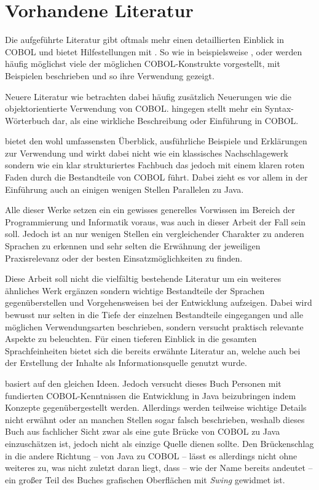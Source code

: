 \section{Vorhandene Literatur}
Die aufgeführte Literatur gibt oftmals mehr einen detaillierten Einblick in COBOL und bietet Hilfestellungen mit . So wie in beispielsweise ,   oder  werden häufig möglichst viele der möglichen COBOL-Konstrukte vorgestellt, mit Beispielen beschrieben und so ihre Verwendung gezeigt. 

Neuere Literatur wie  betrachten dabei häufig zusätzlich Neuerungen wie die objektorientierte Verwendung von COBOL.  
hingegen stellt mehr ein Syntax-Wörterbuch dar, als eine wirkliche Beschreibung oder Einführung in COBOL.

 bietet den wohl umfassensten Überblick, ausführliche Beispiele und Erklärungen zur Verwendung und wirkt dabei nicht wie ein klassisches Nachschlagewerk sondern wie ein klar strukturiertes Fachbuch das jedoch mit einem klaren roten Faden durch die Bestandteile von COBOL führt. Dabei zieht es vor allem in der Einführung auch an einigen wenigen Stellen Parallelen zu Java. 

Alle dieser Werke setzen ein ein gewisses generelles Vorwissen im Bereich der Programmierung und Informatik voraus, was auch in dieser Arbeit der Fall sein soll. Jedoch ist an nur wenigen Stellen ein vergleichender Charakter zu anderen Sprachen zu erkennen und sehr selten die Erwähnung der jeweiligen Praxisrelevanz oder der besten Einsatzmöglichkeiten zu finden. 

Diese Arbeit soll nicht die vielfältig bestehende Literatur um ein weiteres ähnliches Werk ergänzen sondern wichtige Bestandteile der Sprachen gegenüberstellen und Vorgehensweisen bei der Entwicklung aufzeigen. Dabei wird bewusst nur selten in die Tiefe der einzelnen Bestandteile eingegangen und alle möglichen Verwendungsarten beschrieben, sondern versucht praktisch relevante Aspekte zu beleuchten. Für einen tieferen Einblick in die gesamten Sprachfeinheiten bietet sich die bereits erwähnte Literatur an, welche auch bei der Erstellung der Inhalte als Informationsquelle genutzt wurde.

 basiert auf den gleichen Ideen. Jedoch versucht dieses Buch Personen mit fundierten COBOL-Kenntnissen die Entwicklung in Java beizubringen indem Konzepte gegenübergestellt werden. Allerdings werden teilweise wichtige Details nicht erwähnt oder an manchen Stellen sogar falsch beschrieben, weshalb dieses Buch aus fachlicher Sicht zwar als eine gute Brücke von COBOL zu Java einzuschätzen ist, jedoch nicht als einzige Quelle dienen sollte. Den Brückenschlag in die andere Richtung -- von Java zu COBOL -- lässt es allerdings nicht ohne weiteres zu, was nicht zuletzt daran liegt, dass -- wie der Name bereits andeutet -- ein großer Teil des Buches grafischen Oberflächen mit \textit{Swing} gewidmet ist.

